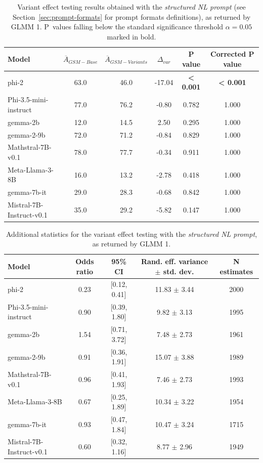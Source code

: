 \documentclass[11pt]{article}
\newcommand{\pbdesc}{P~values falling below the standard significance threshold $\alpha=0.05$ marked in bold.}
\begin{document}
\begin{table}[H]
\centering
\small
\begin{tabular}{lccccc}
\toprule
Model & $\overline{A}_{GSM-Base}$ & $\overline{A}_{GSM-Variants}$ & $\Delta_{var}$ & P value & Corrected P value \\
\midrule
phi-2 & 63.0 & 46.0 & -17.04 & \textbf{< 0.001} & \textbf{< 0.001} \\
Phi-3.5-mini-instruct & 77.0 & 76.2 & -0.80 & 0.782 & 1.000 \\
gemma-2b & 12.0 & 14.5 & 2.50 & 0.295 & 1.000 \\
gemma-2-9b & 72.0 & 71.2 & -0.84 & 0.829 & 1.000 \\
Mathstral-7B-v0.1 & 78.0 & 77.7 & -0.34 & 0.911 & 1.000 \\
Meta-Llama-3-8B & 16.0 & 13.2 & -2.78 & 0.418 & 1.000 \\
gemma-7b-it & 29.0 & 28.3 & -0.68 & 0.842 & 1.000 \\
Mistral-7B-Instruct-v0.1 & 35.0 & 29.2 & -5.82 & 0.147 & 1.000 \\
\bottomrule
\end{tabular}
\caption{Variant effect testing results obtained with the \textit{structured NL prompt} (see Section~\ref{sec:prompt-formats} for prompt formats definitions), as returned by GLMM 1. \pbdesc}
\label{tab:formal-results}
\end{table}

\begin{table}[H]
\centering
\small
\begin{tabular}{lcccc}
\toprule
Model & Odds ratio & 95\% CI & Rand. eff. variance $\pm$ std. dev. & N estimates \\
\midrule
phi-2 & 0.23 & [0.12, 0.41] & 11.83 $\pm$ 3.44 & 2000 \\
Phi-3.5-mini-instruct & 0.90 & [0.39, 1.80] & 9.82 $\pm$ 3.13 & 1995 \\
gemma-2b & 1.54 & [0.71, 3.72] & 7.48 $\pm$ 2.73 & 1961 \\
gemma-2-9b & 0.91 & [0.36, 1.91] & 15.07 $\pm$ 3.88 & 1989 \\
Mathstral-7B-v0.1 & 0.96 & [0.41, 1.93] & 7.46 $\pm$ 2.73 & 1993 \\
Meta-Llama-3-8B & 0.67 & [0.25, 1.89] & 10.34 $\pm$ 3.22 & 1954 \\
gemma-7b-it & 0.93 & [0.47, 1.84] & 10.47 $\pm$ 3.24 & 1715 \\
Mistral-7B-Instruct-v0.1 & 0.60 & [0.32, 1.16] & 8.77 $\pm$ 2.96 & 1949 \\
\bottomrule
\end{tabular}
\caption{Additional statistics for the variant effect testing with the \textit{structured NL prompt}, as returned by GLMM 1.}
\label{tab:formal-stats}
\end{table}
\end{document}
